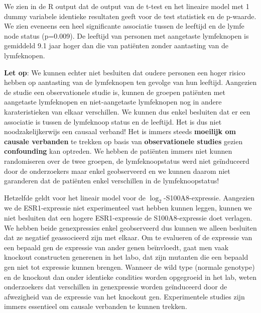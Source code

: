 \documentclass[
  12pt,dutch,coursenotes]{book}
\begin{document}
We zien in de R output dat de output van de t-test en het lineaire model met 1 dummy variabele identieke resultaten geeft voor de test statistiek en de p-waarde.
We zien eveneens een heel significante associatie tussen de leeftijd en de lymfe node status (p=0.009).
De leeftijd van personen met aangetaste lymfeknopen is gemiddeld 9.1 jaar hoger dan die van patiënten zonder aantasting van de lymfeknopen.

\textbf{Let op}: We kunnen echter niet besluiten dat oudere personen een hoger risico hebben op aantasting van de lymfeknopen ten gevolge van hun leeftijd.
Aangezien de studie een observationele studie is, kunnen de groepen patiënten met aangetaste lymfeknopen en niet-aangetaste lymfeknopen nog in andere karateristieken van elkaar verschillen.
We kunnen dus enkel besluiten dat er een associatie is tussen de lymfeknoop status en de leeftijd.
Het is dus niet noodzakelijkerwijs een causaal verband!
Het is immers steeds \textbf{moeilijk om causale verbanden} te trekken op basis van \textbf{observationele studies} gezien \textbf{confounding} kan optreden.
We hebben de patiënten immers niet kunnen randomiseren over de twee groepen, de lymfeknoopstatus werd niet geïnduceerd door de onderzoekers maar enkel geobserveerd en we kunnen daarom niet garanderen dat de patiënten enkel verschillen in de lymfeknoopstatus!

Hetzelfde geldt voor het lineair model voor de \(\log_2\)-S100A8-expressie. Aangezien we de ESR1-expressie niet experimenteel vast hebben kunnen leggen, kunnen we niet besluiten dat een hogere ESR1-expressie de S100A8-expressie doet verlagen. We hebben beide genexpressies enkel geobserveerd dus kunnen we alleen besluiten dat ze negatief geassocieerd zijn met elkaar. Om te evalueren of de expressie van een bepaald gen de expressie van ander genen beïnvloedt, gaat men vaak knockout constructen generenen in het labo, dat zijn mutanten die een bepaald gen niet tot expressie kunnen brengen. Wanneer de wild type (normale genotype) en de knockout dan onder identieke condities worden opgegroeid in het lab, weten onderzoekers dat verschillen in genexpressie worden geïnduceerd door de afwezigheid van de expressie van het knockout gen. Experimentele studies zijn immers essentieel om causale verbanden te kunnen trekken.
\end{document}
